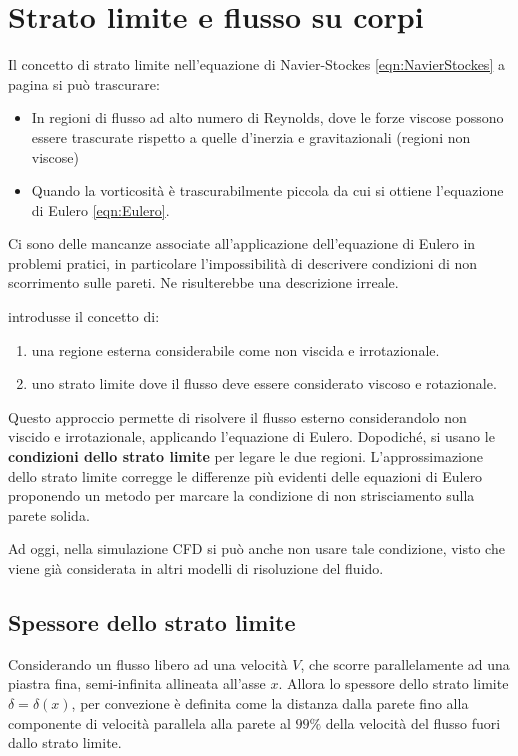 \chapter{Strato limite e flusso su corpi}\label{chp:BoundaryLayer}
Il concetto di strato limite nell'equazione di Navier-Stockes \eqref{eqn:NavierStockes} a pagina \pageref{eqn:NavierStockes} si può trascurare:
\begin{itemize}
\item In regioni di flusso ad alto numero di Reynolds, dove le forze viscose possono essere trascurate rispetto a quelle d'inerzia e gravitazionali (regioni non viscose)
\item Quando la vorticosità è trascurabilmente piccola da cui si ottiene l'equazione di Eulero \eqref{eqn:Eulero}.
\end{itemize}
Ci sono delle mancanze associate all'applicazione dell'equazione di Eulero in problemi pratici, in particolare l'impossibilità di descrivere condizioni di non scorrimento sulle pareti. Ne risulterebbe una descrizione irreale.

 introdusse il concetto di:
\begin{enumerate}
\item una regione esterna considerabile come non viscida e irrotazionale.
\item uno strato limite dove il flusso deve essere considerato viscoso e rotazionale.
\end{enumerate}
Questo approccio permette di risolvere il flusso esterno considerandolo non viscido e irrotazionale, applicando l'equazione di Eulero.
Dopodiché, si usano le \textbf{condizioni dello strato limite} per legare le due regioni.
L'approssimazione dello strato limite corregge le differenze più evidenti delle equazioni di Eulero proponendo un metodo per marcare la condizione di non strisciamento sulla parete solida.

Ad oggi, nella simulazione \ac{CFD} si può anche non usare tale condizione, visto che viene già considerata in altri modelli di risoluzione del fluido.

\section{Spessore dello strato limite}
Considerando un flusso libero ad una velocità $V$, che scorre parallelamente ad una piastra fina, semi-infinita allineata all'asse $x$.
Allora lo spessore dello strato limite $\delta = \delta(x)$, per convezione è definita come la distanza dalla parete fino alla componente di velocità parallela alla parete al $99\%$ della velocità del flusso fuori dallo strato limite.

